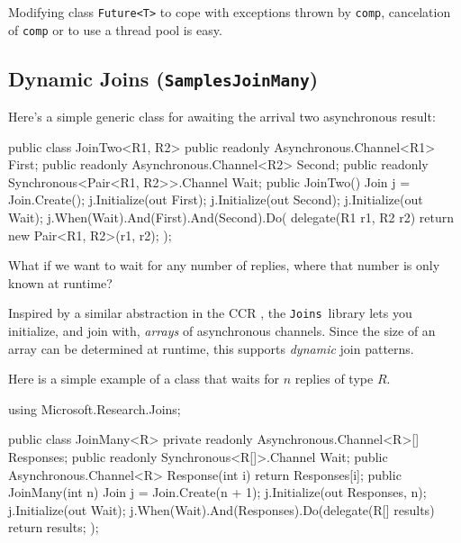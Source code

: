 \documentclass{article}
\newcommand{\sample}[1]{\texorpdfstring{{(\texttt{Samples{\symbol{92}}#1})}}{}}
\newcommand{\joins}{{\texttt{Joins}}}
\newcommand{\tvarr}{\ensuremath{R}}
\begin{document}
Modifying class \texttt{Future<T>} to cope with exceptions thrown by 
\texttt{comp}, cancelation of \texttt{comp} or to use a thread pool 
is easy.

\subsection{Dynamic Joins \sample{JoinMany}}\label{sec:dynamicjoins}

Here's a simple generic class for awaiting the arrival two asynchronous result:

\begin{lstcsharp}
public class JoinTwo<R1, R2> {
  public readonly Asynchronous.Channel<R1> First; 
  public readonly Asynchronous.Channel<R2> Second;
  public readonly Synchronous<Pair<R1, R2>>.Channel Wait;
  public JoinTwo(){
    Join j = Join.Create();
    j.Initialize(out First);
    j.Initialize(out Second);
    j.Initialize(out Wait);
    j.When(Wait).And(First).And(Second).Do(
      delegate(R1 r1, R2 r2)
      {
        return new Pair<R1, R2>(r1, r2);
      });
 }
}
\end{lstcsharp}


What if we want to wait for 
any number of replies, where that number is only known at runtime?

Inspired by a similar abstraction in the CCR \cite{scool:ccr}, the \joins\ library lets you initialize, and join with, \emph{arrays} of 
asynchronous channels.
Since the size of an array can be determined at runtime, this supports \emph{dynamic} join patterns.

Here is a simple example of a class that waits for $n$ replies of type \tvarr.

\begin{lstcsharp}
using Microsoft.Research.Joins;

public class JoinMany<R> {
  private readonly Asynchronous.Channel<R>[] Responses;
  public readonly Synchronous<R[]>.Channel Wait;
  public Asynchronous.Channel<R> Response(int i) {
    return Responses[i];
  }
  public JoinMany(int n) {
    Join j = Join.Create(n + 1);
    j.Initialize(out Responses, n);
    j.Initialize(out Wait);
    j.When(Wait).And(Responses).Do(delegate(R[] results)
    {
      return results;
    });
  }
}
\end{lstcsharp}
\end{document}

